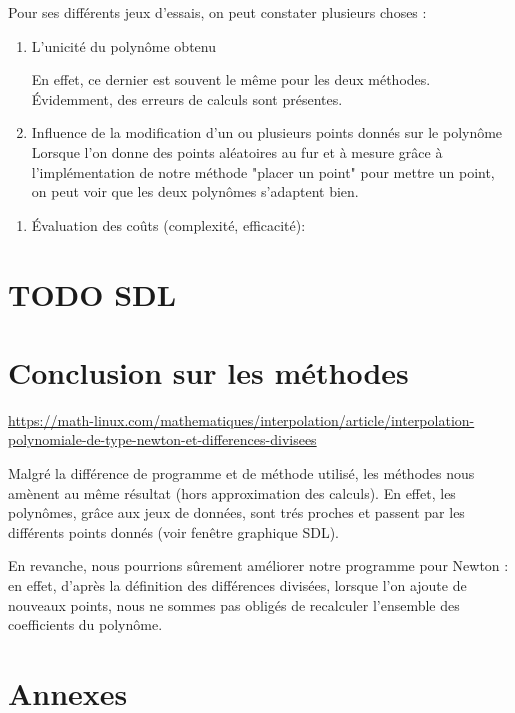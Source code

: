 \documentclass[letter]{article}
\begin{document}
Pour ses différents jeux d'essais, on peut constater plusieurs choses :

\begin{enumerate}
\item L'unicité du polynôme obtenu

En effet, ce dernier est souvent le même pour les deux méthodes. Évidemment, des erreurs de calculs sont présentes.

\item Influence de la modification d'un ou plusieurs points donnés sur le polynôme
Lorsque l'on donne des points aléatoires au fur et à mesure grâce à l'implémentation de notre méthode "placer un point" pour mettre un point, on peut voir que les deux polynômes s'adaptent bien.
\end{enumerate}


\begin{enumerate}
\item Évaluation des coûts (complexité, efficacité):
\end{enumerate}


\section{{\bfseries\sffamily TODO} SDL}
\label{sec:org055bcf0}

\section{Conclusion sur les méthodes}
\label{sec:org4fc01bf}


\url{https://math-linux.com/mathematiques/interpolation/article/interpolation-polynomiale-de-type-newton-et-differences-divisees}

Malgré la différence de programme et de méthode utilisé, les méthodes nous amènent au même résultat (hors approximation des calculs). En effet, les polynômes, grâce aux jeux de données, sont trés proches et passent par les différents points donnés (voir fenêtre graphique SDL).

En revanche, nous pourrions sûrement améliorer notre programme pour Newton : en effet, d'après la définition des différences divisées, lorsque l'on ajoute de nouveaux points, nous ne sommes pas obligés de recalculer l'ensemble des coefficients du polynôme.





\section{Annexes}
\label{sec:org9b91064}
\end{document}
